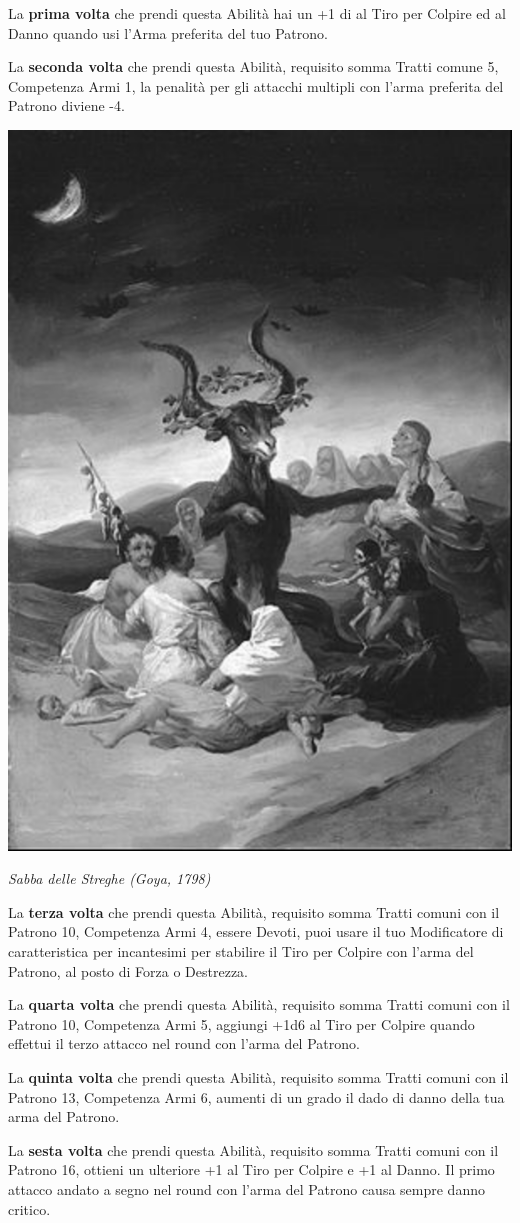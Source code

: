 \begin{multicols}{2}
La \textbf{prima volta} che prendi questa Abilità hai un +1 di al Tiro per Colpire ed al Danno quando usi l'Arma preferita del tuo Patrono.

La \textbf{seconda volta} che prendi questa Abilità, requisito somma Tratti comune 5, Competenza Armi 1, la penalità per gli attacchi multipli con l'arma preferita del Patrono diviene -4.


\begin{center}
	\includegraphics[width=0.56\linewidth]{immagini/streghegoya.png}

	\emph{Sabba delle Streghe (Goya, 1798)}
\end{center}

La \textbf{terza volta} che prendi questa Abilità, requisito somma Tratti comuni con il Patrono 10, Competenza Armi 4, essere Devoti, puoi usare il tuo Modificatore di caratteristica per incantesimi per stabilire il Tiro per Colpire con l'arma del Patrono, al posto di Forza o Destrezza.

La \textbf{quarta volta} che prendi questa Abilità, requisito somma Tratti comuni con il Patrono 10, Competenza Armi 5, aggiungi +1d6 al Tiro per Colpire quando effettui il terzo attacco nel round con l'arma del Patrono.

La \textbf{quinta volta} che prendi questa Abilità, requisito somma Tratti comuni con il Patrono 13, Competenza Armi 6, aumenti di un grado il dado di danno della tua arma del Patrono.

La \textbf{sesta volta} che prendi questa Abilità, requisito somma Tratti comuni con il Patrono 16, ottieni un ulteriore +1 al Tiro per Colpire e +1 al Danno. Il primo attacco andato a segno nel round con l'arma del Patrono causa sempre danno critico.


\end{multicols}
